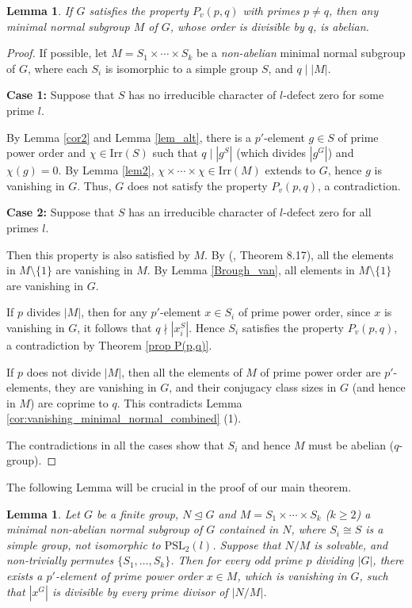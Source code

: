 \documentclass[11pt, a4paper]{article}
\numberwithin{equation}{section}
\theoremstyle{plain} %
\newtheorem{lemma}[theorem]{Lemma}
\begin{document}
\begin{lemma}\label{lemab}
If $G$ satisfies the property $P_v(p,q)$ with primes $p\neq q$, then any minimal normal subgroup $M$ of $G$, whose order is divisible by $q$, is abelian. 
\end{lemma}
\begin{proof}
If possible, let $M = S_1 \times \cdots \times S_k$ be a \textit{non-abelian} minimal normal subgroup of $G$, where each $S_i$ is isomorphic to a simple group $S$, and $q \mid |M|$.

\noindent
\textbf{Case 1:} Suppose that $S$ has no irreducible character of $l$-defect zero for some prime $l$.

\noindent
By Lemma \ref{cor2} and Lemma \ref{lem_alt}, there is a $p'$-element $g \in S$ of prime power order and $\chi \in \mathrm{Irr}(S)$ such that $q \mid |g^S|$ (which divides $|g^G|$) and  $\chi(g) = 0$. By Lemma \ref{lem2}, $\chi\times\cdots\times \chi\in \mathrm{Irr}(M)$ extends to $G$, hence $g$ is vanishing in $G$. Thus, $G$ does not satisfy the property $P_v(p,q)$, a contradiction.



\noindent
\textbf{Case 2:} Suppose that $S$ has an irreducible character of $l$-defect zero for all primes $l$.

Then this property is also satisfied by $M$. By (\cite{MR1280461}, Theorem 8.17),  all the elements in $M \setminus \{1\}$ are vanishing in $M$. By Lemma \ref{Brough_van}, all elements in $M \setminus \{1\}$ are vanishing in $G$.

If $p$ divides $|M|$, then for any $p'$-element $x\in S_i$ of prime power order, since $x$ is vanishing in $G$, it follows that $q \nmid |x^S_i|$. Hence $S_i$ satisfies the property $P_v(p,q)$, a contradiction by Theorem \ref{prop P(p,q)}.

If $p$ does not divide $|M|$, then all the elements of $M$ of prime power order are $p'$-elements, they are vanishing in $G$, and their conjugacy class sizes in $G$ (and hence in $M$) are coprime to $q$. This contradicts Lemma \ref{cor:vanishing_minimal_normal_combined} (1).

The contradictions in all the cases show that $S_i$ and hence $M$ must be abelian ($q$-group).\end{proof}

The following Lemma will be crucial in the proof of our main theorem.

\begin{lemma}\label{lemn}
Let $G$ be a finite group, $N\trianglelefteq G$ and $M=S_1\times \cdots \times S_k$ ($k\ge 2$) a minimal non-abelian normal subgroup of $G$ contained in $N$, where $S_i\cong S$ is a simple group, not isomorphic to $\mathrm{PSL}_2(l)$. Suppose that $N/M$ is solvable, and non-trivially permutes $\{S_1,\ldots, S_k\}$. Then for every odd prime $p$ dividing $|G|$, there exists a $p'$-element of prime power order $x\in M$, which is vanishing in $G$, such that $|x^G|$ is divisible by every prime divisor of $|N/M|$.    
\end{lemma}
\end{document}
